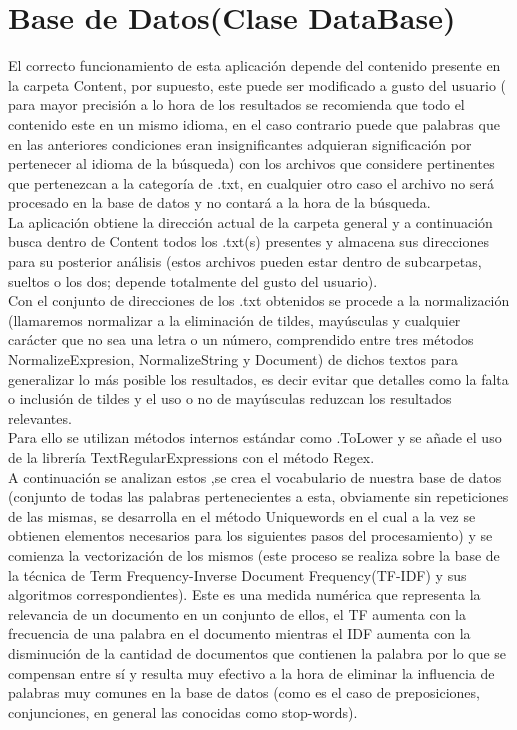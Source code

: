 \documentclass[options]{article}
\begin{document}
\section{Base de Datos(Clase DataBase)}
El correcto funcionamiento de esta aplicación depende del contenido presente en la carpeta Content, por supuesto, este puede ser modificado a gusto del usuario ( para mayor precisión a lo hora de los resultados se recomienda que todo el contenido este en un mismo idioma, en el caso contrario puede que palabras que en las anteriores condiciones eran insignificantes adquieran significación por pertenecer al idioma de la búsqueda) con los archivos que considere pertinentes que pertenezcan a la categoría de .txt, en cualquier otro caso el archivo no será procesado en la base de datos y no contará a la hora de la búsqueda.\\
La aplicación obtiene la dirección actual de la carpeta general y a continuación busca dentro de Content todos los .txt(s) presentes y almacena sus direcciones para su posterior análisis (estos archivos pueden estar dentro de subcarpetas, sueltos o los dos; depende totalmente del gusto del usuario).\\
Con el conjunto de direcciones de los .txt obtenidos se procede a la normalización (llamaremos normalizar a la eliminación de tildes, mayúsculas y cualquier carácter que no sea una letra o un número, comprendido entre tres métodos NormalizeExpresion, NormalizeString y Document) de dichos textos para generalizar lo más posible los resultados, es decir evitar que detalles como la falta o inclusión de tildes y el uso o no de mayúsculas reduzcan los resultados relevantes.\\
Para ello se utilizan métodos internos estándar como .ToLower y se añade el uso de la librería TextRegularExpressions con el método Regex.\\
A continuación se analizan estos ,se crea el vocabulario de nuestra base de datos (conjunto de todas las palabras pertenecientes a esta, obviamente sin repeticiones de las mismas, se desarrolla en el método Uniquewords en el cual a la vez se obtienen elementos necesarios para los siguientes pasos del procesamiento) y se comienza  la vectorización de los mismos (este proceso se realiza sobre la base de la técnica de  Term Frequency-Inverse Document Frequency(TF-IDF) y sus algoritmos correspondientes). Este es una medida numérica que representa la relevancia de un documento en un conjunto de ellos, el TF aumenta con la frecuencia de una palabra en el documento mientras el IDF aumenta con la disminución de la cantidad de documentos que contienen la palabra por lo que se compensan entre sí y resulta muy efectivo a la hora de eliminar la influencia de palabras muy comunes en la base de datos (como es el caso de preposiciones, conjunciones, en general las conocidas como stop-words).\\
\end{document}
